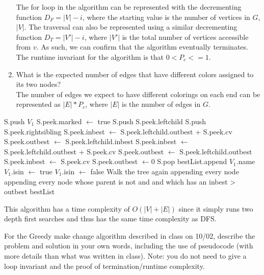 \documentclass{article}
\begin{document}
\begin{enumerate}
    The for loop in the algorithm can be represented with the decrementing function $D_F = |V| - i$, where the starting value is the number of vertices in $G$, $|V|$. The traversal can also be represented using a similar decrementing function $D_T = |V'| - i$, where $|V'|$ is the total number of vertices accessible from $v$. As such, we can confirm that the algorithm eventually terminates. \\
    
    The runtime invariant for the algorithm is that $0 < P_c <= 1$.
    \item What is the expected number of edges that have different colors
        assigned to its two nodes?\\
        
    The number of edges we expect to have different colorings on each end can be represented as $|E| * P_c$, where $|E|$ is the number of edges in $G$.
\end{enumerate}

\nextprob
\begin{algorithm}
\begin{algorithmic}
	\State S.push $V_1$
			\State S.peek.marked $\gets$ true
				\State S.push S.peek.leftchild
				\State S.push S.peek.rightsibling
			\EndIf
		\Else
					\State S.peek.inbest $\gets$ S.peek.leftchild.outbest + S.peek.cv
					\State S.peek.outbest $\gets$ S.peek.leftchild.inbest
				\Else
					\State S.peek.inbest $\gets$ S.peek.leftchild.outbest + S.peek.cv
					\State S.peek.outbest $\gets$ S.peek.leftchild.outbest
				\EndIf
			\Else
				\State S.peek.inbest $\gets$ S.peek.cv
				\State S.peek.outbest $\gets 0$
			\EndIf
			\State S.pop
		\EndIf
	\EndWhile
		\State bestList.append $V_1$.name
		\State $V_1$.isin $\gets$ true
	\Else
		\State $V_1$.isin $\gets$ false
	\EndIf
	\State Walk the tree again appending every node appending every node whose parent is not and and which has an inbest > outbest
	\Return bestList
\EndProcedure
\end{algorithmic}
\end{algorithm}
This algorithm has a time complexity of $O(|V| + |E|)$ since it simply runs two depth first searches and thus has the same time complexity as DFS.

\nextprob
For the Greedy make change algorithm described in class on 10/02, describe the
problem and solution in your own words, including the use of pseudocode (with
more details than what was written in class).  Note: you do not need to give a
loop invariant and the proof of termination/runtime complexity.
\end{document}
